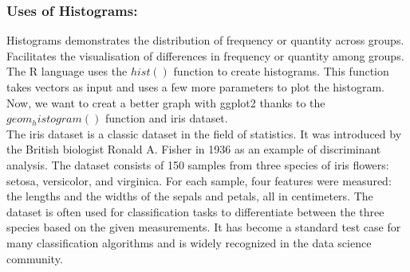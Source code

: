 \documentclass{article}\usepackage[]{graphicx}\usepackage[]{xcolor}
\begin{document}
\subsubsection{Uses of Histograms:}
Histograms demonstrates the distribution of frequency or quantity across groups.\\
Facilitates the visualisation of differences in frequency or quantity among groups.\\
The R language uses the $hist()$ function to create histograms. This function takes vectors as input and uses a few more parameters to plot the histogram.\\
Now, we want to creat a better graph with ggplot2 thanks to the $geom_histogram()$ function and iris dataset.\\
The iris dataset is a classic dataset in the field of statistics. It was introduced by the British biologist Ronald A. Fisher in 1936 as an example of discriminant analysis. The dataset consists of 150 samples from three species of iris flowers: setosa, versicolor, and virginica. For each sample, four features were measured: the lengths and the widths of the sepals and petals, all in centimeters. The dataset is often used for classification tasks to differentiate between the three species based on the given measurements. It has become a standard test case for many classification algorithms and is widely recognized in the data science community.\\
\end{document}
